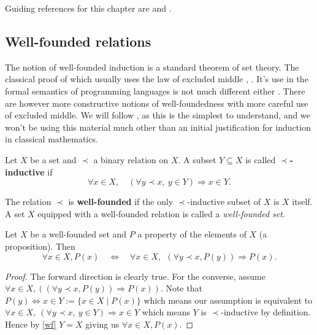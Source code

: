 Guiding references for this chapter are \cite{Sorensen} and \cite{BarendregtHenk2013Lcwt}.

\subsection{Well-founded relations}

The notion of well-founded induction is a standard theorem of set theory. The classical proof of which usually uses the law of excluded middle \cite[p. 62]{johnstone1987notes}, \cite[Ch. 7]{barwise1982handbook}. It's use in the formal semantics of programming languages is not much different either \cite[Ch. 3]{winskel1993formal}. There are however more constructive notions of well-foundedness \cite[\S 8]{2018arXiv180805204S} with more careful use of excluded middle. We will follow \cite{10.2307/2275781}, as this is the simplest to understand, and we won't be using this material much other than an initial justification for induction in classical mathematics.

\begin{defin}
    Let $X$ be a set and $\prec$ a binary relation on $X$. A subset $Y \subseteq X$ is called \textbf{$\prec$-inductive} if
    $$
        \forall x \in X, \quad (\forall y \prec x,\ y \in Y) \Rightarrow x \in Y.
    $$
\end{defin}

\begin{defin}\label{wf}
    The relation $\prec$ is \textbf{well-founded} if the only $\prec$-inductive subset of $X$ is $X$ itself. A set $X$ equipped with a well-founded relation is called a \textit{well-founded set}.
\end{defin}

\begin{theorem}
    Let $X$ be a well-founded set and $P$ a property of the elements of $X$ (a proposition). Then
    $$
        \forall x \in X, P(x) \quad \iff \quad  \forall x \in X,\ \ (\forall y \prec x, P(y)) \Rightarrow P(x).
    $$
\end{theorem}

\begin{proof}
    The forward direction is clearly true. For the converse, assume $\forall x \in X,((\forall y \prec x, P(y)) \Rightarrow P(x))$. Note that $P(y) \Leftrightarrow x \in Y := \{ x \in X \mid P(x)\} $ which means our assumption is equivalent to $\forall x \in X,\ (\forall y \prec x,\ y \in Y) \Rightarrow x \in Y$ which means $Y$ is $\prec$-inductive by definition. Hence by \ref{wf} $Y=X$ giving us $ \forall x \in X, P(x)$.
\end{proof}


